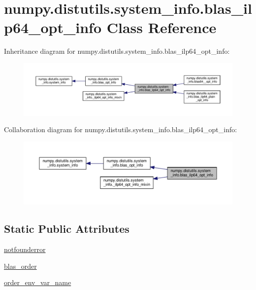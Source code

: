 \hypertarget{classnumpy_1_1distutils_1_1system__info_1_1blas__ilp64__opt__info}{}\section{numpy.\+distutils.\+system\+\_\+info.\+blas\+\_\+ilp64\+\_\+opt\+\_\+info Class Reference}
\label{classnumpy_1_1distutils_1_1system__info_1_1blas__ilp64__opt__info}


Inheritance diagram for numpy.\+distutils.\+system\+\_\+info.\+blas\+\_\+ilp64\+\_\+opt\+\_\+info\+:
\nopagebreak
\begin{figure}[H]
\begin{center}
\leavevmode
\includegraphics[width=350pt]{classnumpy_1_1distutils_1_1system__info_1_1blas__ilp64__opt__info__inherit__graph}
\end{center}
\end{figure}


Collaboration diagram for numpy.\+distutils.\+system\+\_\+info.\+blas\+\_\+ilp64\+\_\+opt\+\_\+info\+:
\nopagebreak
\begin{figure}[H]
\begin{center}
\leavevmode
\includegraphics[width=350pt]{classnumpy_1_1distutils_1_1system__info_1_1blas__ilp64__opt__info__coll__graph}
\end{center}
\end{figure}
\subsection*{Static Public Attributes}
\begin{DoxyCompactItemize}
\item 
\hyperlink{classnumpy_1_1distutils_1_1system__info_1_1blas__ilp64__opt__info_aabbdf48812907a8739f2eabe09b3b59e}{notfounderror}
\item 
\hyperlink{classnumpy_1_1distutils_1_1system__info_1_1blas__ilp64__opt__info_a1e6385913a294d1bbd8595e4f05fd64e}{blas\+\_\+order}
\item 
\hyperlink{classnumpy_1_1distutils_1_1system__info_1_1blas__ilp64__opt__info_acfc7e58323bc958c5f95b8e258c72d31}{order\+\_\+env\+\_\+var\+\_\+name}
\end{DoxyCompactItemize}
